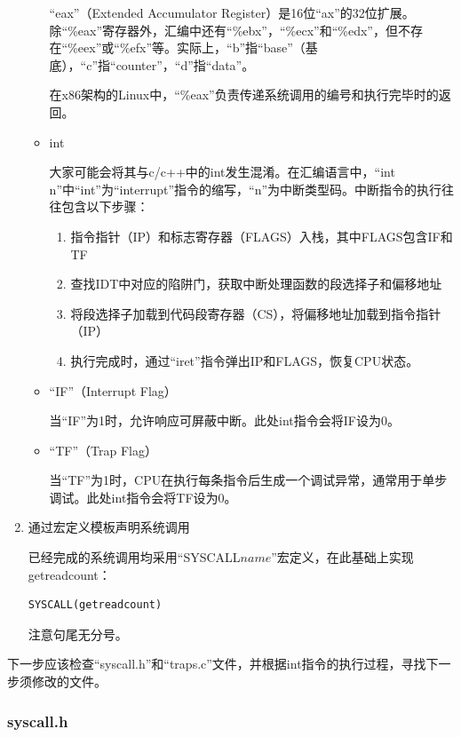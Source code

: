 \documentclass[fontset=ubuntu]{ctexart}
\begin{document}
\begin{enumerate}
\begin{itemize}[listparindent=2em]
                    “eax”（Extended Accumulator Register）是16位“ax”的32位扩展。除“\%eax”寄存器外，汇编中还有“\%ebx”，“\%ecx”和“\%edx”，但不存在“\%eex”或“\%efx”等。实际上，“b”指“base”（基底），“c”指“counter”，“d”指“data”。

                    在x86架构的Linux中，“\%eax”负责传递系统调用的编号和执行完毕时的返回。
              \item int

                    大家可能会将其与c/c++中的int发生混淆。在汇编语言中，“int n”中“int”为“interrupt”指令的缩写，“n”为中断类型码。中断指令的执行往往包含以下步骤：
                    \begin{enumerate}
                        \item 指令指针（IP）和标志寄存器（FLAGS）入栈，其中FLAGS包含IF和TF
                        \item 查找IDT中对应的陷阱门，获取中断处理函数的段选择子和偏移地址
                        \item 将段选择子加载到代码段寄存器（CS），将偏移地址加载到指令指针（IP）
                        \item 执行完成时，通过“iret”指令弹出IP和FLAGS，恢复CPU状态。
                    \end{enumerate}
              \item “IF”（Interrupt Flag）

                    当“IF”为1时，允许响应可屏蔽中断。此处int指令会将IF设为0。

              \item “TF”（Trap Flag）

                    当“TF”为1时，CPU在执行每条指令后生成一个调试异常，通常用于单步调试。此处int指令会将TF设为0。
          \end{itemize}
    \item 通过宏定义模板声明系统调用

          已经完成的系统调用均采用“SYSCALL\(name\)”宏定义，在此基础上实现getreadcount：
          \begin{lstlisting}[language={[x86masm]Assembler}]
SYSCALL(getreadcount)
            \end{lstlisting}
          注意句尾无分号。
\end{enumerate}

下一步应该检查“syscall.h”和“traps.c”文件，并根据int指令的执行过程，寻找下一步须修改的文件。

\subsubsection{syscall.h}
\end{document}
